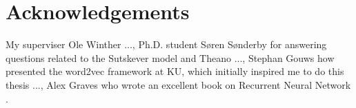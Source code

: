 \chapter{Acknowledgements}

My superviser Ole Winther ..., Ph.D. student Søren Sønderby for answering questions related to the Sutskever model \cite{sutskever} and Theano \cite{theano-a, theano-b} ..., Stephan Gouws how presented the word2vec framework \cite{word2vec-comparing, word2vec-details} at KU, which initially inspired me to do this thesis ..., Alex Graves who wrote an excellent book on Recurrent Neural Network \cite{alexgraves}.
